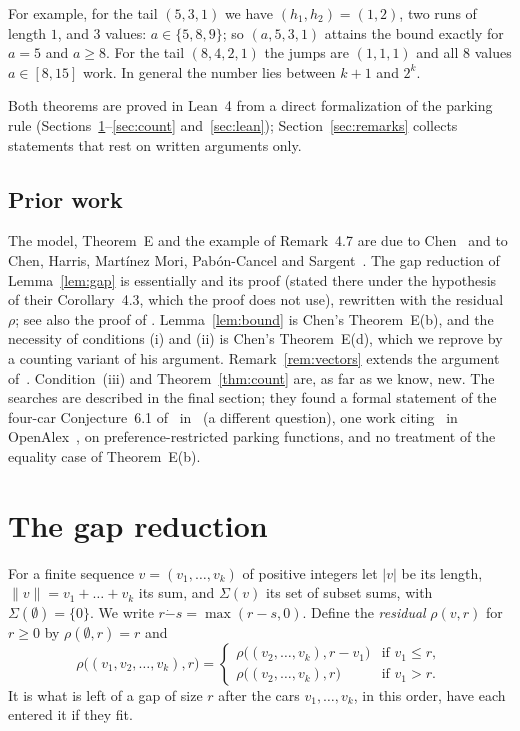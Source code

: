 \documentclass[11pt]{article}
\theoremstyle{remark}
\newcommand{\Sub}{\Sigma}
\newcommand{\monus}{\mathbin{\dot{-}}}
\begin{document}
For example, for the tail $(5,3,1)$ we have $(h_1,h_2)=(1,2)$, two runs of
length $1$, and $3$ values: $a\in\{5,8,9\}$; so $(a,5,3,1)$ attains the bound
exactly for $a=5$ and $a\ge8$. For the tail $(8,4,2,1)$ the jumps are
$(1,1,1)$ and all $8$ values $a\in[8,15]$ work. In general the number lies
between $k+1$ and $2^k$.

Both theorems are proved in Lean~4 from a direct formalization of the parking
rule (Sections~\ref{sec:gap}--\ref{sec:count} and~\ref{sec:lean});
Section~\ref{sec:remarks} collects statements that rest on written arguments
only.

\subsection*{Prior work}
The model, Theorem~E and the example of Remark~4.7 are due to
Chen~\cite{chen} and to Chen, Harris, Martínez Mori, Pabón-Cancel and
Sargent~\cite{chmps}. The gap reduction of Lemma~\ref{lem:gap} is essentially
\cite[Corollary~4.4]{chmps} and its proof (stated there under the hypothesis of
their Corollary~4.3, which the proof does not use), rewritten with the
residual $\rho$; see also the proof of \cite[Lemma~4.4]{chen}. Lemma~\ref{lem:bound} is Chen's Theorem~E(b), and
the necessity of conditions (i) and (ii) is Chen's Theorem~E(d), which we
reprove by a counting variant of his argument. Remark~\ref{rem:vectors} extends
the argument of~\cite[Claim~4.5.3]{chen}. Condition~(iii) and
Theorem~\ref{thm:count} are, as far as we know, new. The searches are
described in the final section; they found a formal statement of the
four-car Conjecture~6.1 of~\cite{chmps} in~\cite{reuf2f} (a different
question), one work citing~\cite{chen} in OpenAlex~\cite{bown}, on
preference-restricted parking functions, and no treatment of the equality case
of Theorem~E(b).

\section{The gap reduction}\label{sec:gap}

For a finite sequence $v=(v_1,\dots,v_k)$ of positive integers let $|v|$ be
its length, $\|v\|=v_1+\dots+v_k$ its sum, and $\Sub(v)$ its set of subset
sums, with $\Sub(\emptyset)=\{0\}$. We write $r\monus s=\max(r-s,0)$. Define
the \emph{residual} $\rho(v,r)$ for $r\ge0$ by $\rho(\emptyset,r)=r$ and
\[
\rho\bigl((v_1,v_2,\dots,v_k),r\bigr)=
\begin{cases}\rho\bigl((v_2,\dots,v_k),r-v_1\bigr)&\text{if }v_1\le r,\\
\rho\bigl((v_2,\dots,v_k),r\bigr)&\text{if }v_1>r.\end{cases}
\]
It is what is left of a gap of size $r$ after the cars $v_1,\dots,v_k$, in this
order, have each entered it if they fit.
\end{document}
